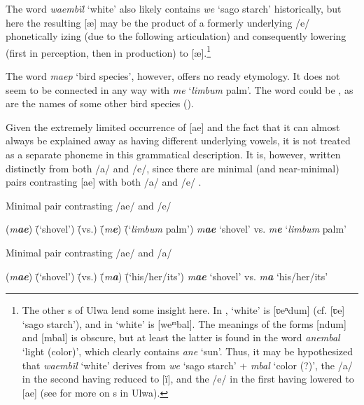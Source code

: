   The word \textit{waembïl} ‘white’ also likely contains \textit{we} ‘sago starch’ historically, but here the resulting [æ] may be the product of a formerly underlying /e/ phonetically izing (due to the following  articulation) and consequently lowering (first in perception, then in production) to [æ].\footnote{The other s of Ulwa lend some insight here. In , ‘white’ is [ʋeⁿdum] (cf. [ʋe] ‘sago starch’), and in  ‘white’ is [weᵐbal]. The meanings of the forms [ndum] and [mbal] is obscure, but at least the latter is found in the   word \textit{anembal} ‘light (color)’, which clearly contains \textit{ane} ‘sun’. Thus, it may be hypothesized that  \textit{waembïl} ‘white’ derives from \textit{we} ‘sago starch’ + \textit{mbal} ‘color (?)’, the /a/ in the second  having reduced to [ï], and the /e/ in the first  having lowered to [ae] (see  for more on s in Ulwa).}

The word \textit{maep} ‘bird species’, however, offers no ready etymology. It does not seem to be connected in any way with \textit{me} ‘\textit{limbum} palm’. The word could be , as are the names of some other bird species ().

  Given the extremely limited occurrence of [ae] and the fact that it can almost always be explained away as having different underlying vowels, it is not treated as a separate phoneme in this grammatical description. It is, however, written distinctly from both /a/ and /e/, since there are  minimal (and near-minimal) pairs contrasting [ae] with both /a/  and /e/ .

\ea%
    \label{ex:phon:52}
          Minimal pair contrasting /ae/ and /e/\\
\begin{tabbing}
{(\textit{m\textbf{ae}})} \= {(‘shovel’)} \= {(vs.)} \= {(\textit{m\textbf{e}})} \= {(‘\textit{limbum} palm’)}\kill
{\textit{m\textbf{ae}}} \> {‘shovel’} \> {vs.} \> {\textit{m\textbf{e}}} \> {‘\textit{limbum} palm’}
\end{tabbing}
\z


\ea%
    \label{ex:phon:53}
          Minimal pair contrasting /ae/ and /a/\\
\begin{tabbing}
{(\textit{m\textbf{ae}})} \= {(‘shovel’)} \= {(vs.)} \= {(\textit{m\textbf{a}})} \= {(‘his/her/its’)}\kill
{\textit{m\textbf{ae}}} \> {‘shovel’} \> {vs.} \> {\textit{m\textbf{a}}} \> {‘his/her/its’}
\end{tabbing}
\z

